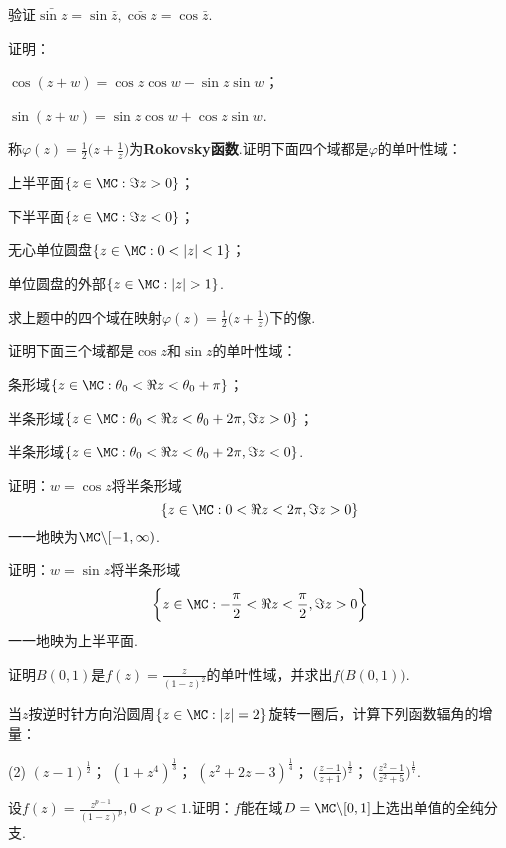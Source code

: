 \begin{xiti}
\begin{enuma}
\end{enuma}
\item 验证$\bar{\sin z}=\sin\bar z,\bar{\cos z}=\cos\bar z$.
\item 证明：
\begin{enuma}
  \item $\cos(z+w)=\cos z\cos w-\sin z\sin w$；
  \item $\sin(z+w)=\sin z\cos w+\cos z\sin w$.
\end{enuma}
\item 称$\varphi(z)=\frac12\bigg(z+\frac1z\bigg)$为\textbf{Rokovsky函数}.证明下面四个域都是$\varphi$的单叶性域：
\begin{enuma}
  \item 上半平面$\{z\in\MC:\Im z>0\}$；
  \item 下半平面$\{z\in\MC:\Im z<0\}$；
  \item 无心单位圆盘$\{z\in\MC:0<|z|<1\}$；
  \item 单位圆盘的外部$\{z\in\MC:|z|>1\}$.
\end{enuma}
\item 求上题中的四个域在映射$\varphi(z)=\frac12\bigg(z+\frac1z\bigg)$下的像.
\item 证明下面三个域都是$\cos z$和$\sin z$的单叶性域：
\begin{enuma}
  \item 条形域$\{z\in\MC:\theta_0<\Re z<\theta_0+\pi\}$；
  \item 半条形域$\{z\in\MC:\theta_0<\Re z<\theta_0+2\pi,\Im z>0\}$；
  \item 半条形域$\{z\in\MC:\theta_0<\Re z<\theta_0+2\pi,\Im z<0\}$.
\end{enuma}
\item 证明：$w=\cos z$将半条形域
\[\{z\in\MC:0<\Re z<2\pi,\Im z>0\}\]
一一地映为$\MC\backslash[-1,\infty)$.
\item 证明：$w=\sin z$将半条形域
\[\bigg\{z\in\MC:-\frac\pi2<\Re z<\frac\pi2,\Im z>0\bigg\}\]
一一地映为上半平面.
\item 证明$B(0,1)$是$f(z)=\frac z{(1-z)^2}$的单叶性域，并求出$f\big(B(0,1)\big)$.
\item 当$z$按逆时针方向沿圆周$\{z\in\MC:|z|=2\}$旋转一圈后，计算下列函数辐角的增量：
\begin{tasks}(2)
  \task $(z-1)^{\frac12}$；
  \task $(1+z^4)^{\frac13}$；
  \task $(z^2+2z-3)^{\frac14}$；
  \task $\bigg(\frac{z-1}{z+1}\bigg)^{\frac12}$；
  \task $\bigg(\frac{z^2-1}{z^2+5}\bigg)^{\frac17}$.
\end{tasks}
\item 设$f(z)=\frac{z^{p-1}}{(1-z)^p},0<p<1$.证明：$f$能在域$D=\MC\backslash[0,1]$上选出单值的全纯分支.

\end{xiti}
